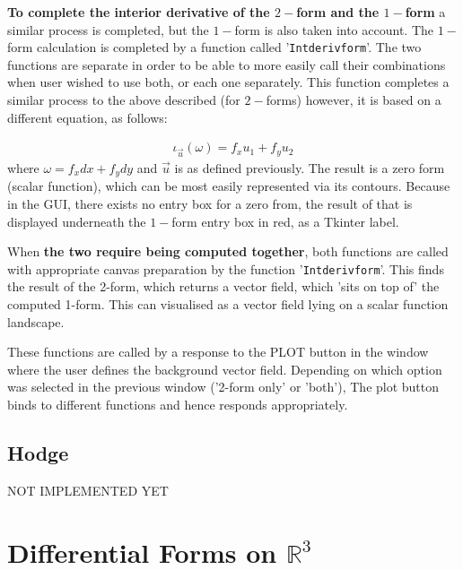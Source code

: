 \documentclass[12pt]{report}
\begin{document}
\noindent \textbf{To complete the interior derivative of the $2-$form and the $1-$form} a similar process is completed, but the $1-$form is also taken into account. The $1-$form calculation is completed by a function called '\texttt{Int\textunderscore deriv\textunderscore form}'. The two functions are separate in order to be able to more easily call their combinations when user wished to use both, or each one separately. This function completes a similar process to the above described (for $2-$forms) however, it is based on a different equation, as follows:

\begin{equation}
	\label{T2} \begin{split}
		\iota_{\vec{u}}(\omega) = f_{x} u_{1} + f_{y} u_{2}
	\end{split}
\end{equation}
where $\omega = f_{x} dx + f_{y} dy$ and $\vec{u}$ is as defined previously. The result is a zero form (scalar function), which can be most easily represented via its contours. Because in the GUI, there exists no entry box for a zero from, the result of that is displayed underneath the $1-$form entry box in red, as a Tkinter label.

When \textbf{the two require being computed together}, both functions are called with appropriate canvas preparation by the function '\texttt{Int\textunderscore deriv\textunderscore form}'. This finds the result of the 2-form, which returns a vector field, which 'sits on top of' the computed 1-form. This can visualised as a vector field lying on a scalar function landscape.

\noindent These functions are called by a response to the PLOT button in the window where the user defines the background vector field. Depending on which option was selected in the previous window ('2-form only' or 'both'), The plot button binds to different functions and hence responds appropriately.

\section{Hodge}


NOT IMPLEMENTED YET



\chapter{Differential Forms on $\mathbb{R}^{3}$}
\end{document}
